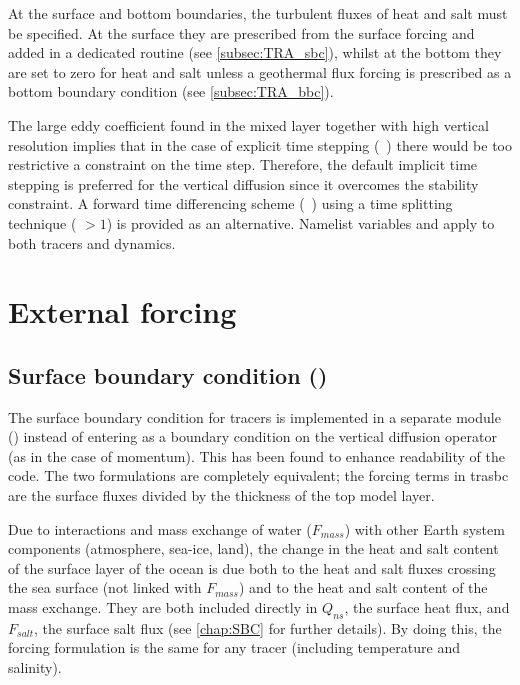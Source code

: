 \documentclass[../main/NEMO_manual]{subfiles}
\begin{document}
At the surface and bottom boundaries, the turbulent fluxes of heat and salt must be specified.
At the surface they are prescribed from the surface forcing and added in a dedicated routine
(see \autoref{subsec:TRA_sbc}), whilst at the bottom they are set to zero for heat and salt unless
a geothermal flux forcing is prescribed as a bottom boundary condition (see \autoref{subsec:TRA_bbc}).

The large eddy coefficient found in the mixed layer together with high vertical resolution implies that
in the case of explicit time stepping (~)
there would be too restrictive a constraint on the time step.
Therefore, the default implicit time stepping is preferred for the vertical diffusion since
it overcomes the stability constraint.
A forward time differencing scheme (~) using
a time splitting technique ( $> 1$) is provided as an alternative.
Namelist variables  and  apply to both tracers and dynamics.

\section{External forcing}
\label{sec:TRA_sbc_qsr_bbc}

\subsection{Surface boundary condition (\protect{})}
\label{subsec:TRA_sbc}

The surface boundary condition for tracers is implemented in a separate module () instead of
entering as a boundary condition on the vertical diffusion operator (as in the case of momentum).
This has been found to enhance readability of the code.
The two formulations are completely equivalent;
the forcing terms in trasbc are the surface fluxes divided by the thickness of the top model layer.

Due to interactions and mass exchange of water ($F_{mass}$) with other Earth system components
(\ie atmosphere, sea-ice, land), the change in the heat and salt content of the surface layer of the ocean is due
both to the heat and salt fluxes crossing the sea surface (not linked with $F_{mass}$) and
to the heat and salt content of the mass exchange.
They are both included directly in $Q_{ns}$, the surface heat flux,
and $F_{salt}$, the surface salt flux (see \autoref{chap:SBC} for further details).
By doing this, the forcing formulation is the same for any tracer (including temperature and salinity).
\end{document}

